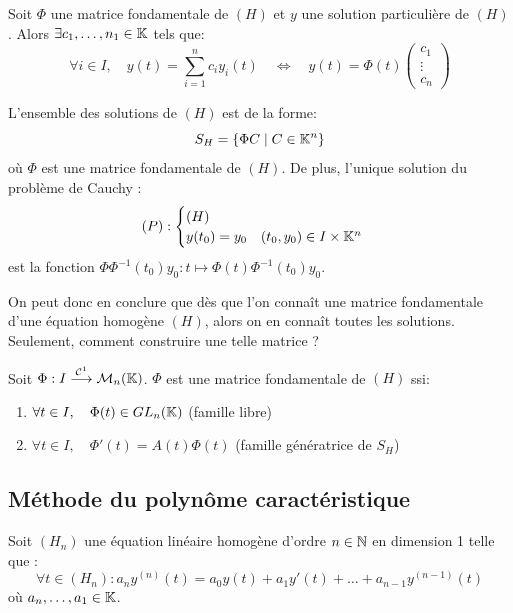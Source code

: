 Soit $\Phi$ une matrice fondamentale de $(H)$ et $y$ une solution particulière de $(H)$.
Alors $ \exists c_1, \dots, n_1 \in  \mathbb{K}$ tels que: 
	\[ \forall i \in  I, \quad y(t) = \sum_{i=1}^{n} c_i y_i(t) \quad \iff \quad y(t) = \Phi(t) 
		\begin{pmatrix}
			c_1 \\ 
			\vdots \\
			c_n 
		\end{pmatrix} \] 

\begin{proposition}
	L'ensemble des solutions de $(H)$ est de la forme: 
		\[ S_H = \{ \Phi C \; | \; C \in  \mathbb{K}^n \} \] 
	où $\Phi$ est une matrice fondamentale de $(H)$. De plus, l'unique solution 
	du problème de Cauchy :
		\[ (P) : \begin{cases}
				(H) \\ 
				y(t_0) = y_0 \quad (t_0, y_0) \in  I \times \mathbb{K}^n
			\end{cases} \]
	est la fonction $ \Phi \Phi^{-1} (t_0) y_0 : t \longmapsto \Phi(t) \Phi^{-1}(t_0) y_0$.  
\end{proposition} 

On peut donc en conclure que dès que l'on connaît une matrice fondamentale 
d'une équation homogène $(H)$, alors on en connaît toutes les solutions. 
Seulement, comment construire une telle matrice ? 

\begin{prop} 
	Soit $\Phi : I \overset{ \mathcal{C}^1}{\longrightarrow} \mathcal{M}_n(\mathbb{K})$. $\Phi$ est 
	une matrice fondamentale de $(H)$ ssi:
	\begin{enumerate} 
		\item $ \forall t \in  I, \quad \Phi(t) \in  GL_n(\mathbb{K}) $ (famille libre) 
		\item $ \forall t \in  I, \quad \Phi '(t) = A(t) \Phi(t) $ (famille génératrice de $S_H$)
	\end{enumerate} 
\end{prop} 

\subsection{Méthode du polynôme caractéristique} 

Soit $(H_n)$ une équation linéaire homogène d'ordre $n \in  \mathbb{N}$ en dimension 1 telle que : 
	\[ \forall t \in (H_n) : a_n y^{(n)}(t) = a_0 y(t) + a_1 y'(t) + \dots + a_{n-1} y^{(n-1)}(t) \]
où $ a_n, \dots, a_1 \in  \mathbb{K}$. 

